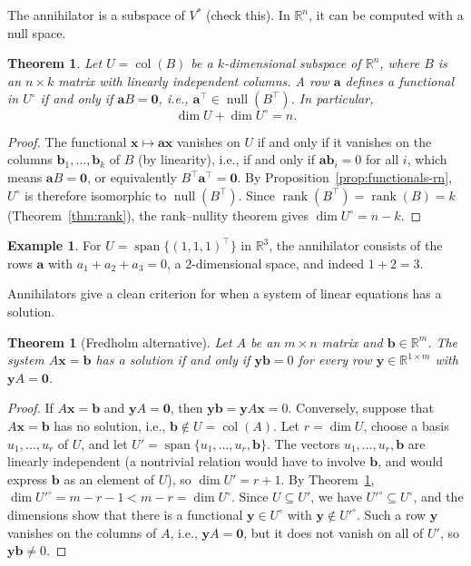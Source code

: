 \documentclass[11pt]{article}
\theoremstyle{definition}
\newtheorem{example}[definition]{Example}
\theoremstyle{plain}
\newtheorem{theorem}[definition]{Theorem}
\theoremstyle{remark}
\DeclareMathOperator{\rank}{rank}
\DeclareMathOperator{\Null}{null}
\DeclareMathOperator{\col}{col}
\DeclareMathOperator{\Span}{span}
\begin{document}
The annihilator is a subspace of $V^*$ (check this). In $\mathbb{R}^n$, it can be computed with a null space.

\begin{theorem}\label{thm:annihilator}
    Let $U = \col(B)$ be a $k$-dimensional subspace of $\mathbb{R}^n$, where $B$ is an $n \times k$ matrix with linearly independent columns. A row $\mathbf{a}$ defines a functional in $U^\circ$ if and only if $\mathbf{a}B = \mathbf{0}$, i.e., $\mathbf{a}^\top \in \Null(B^\top)$. In particular,
    \[\dim U + \dim U^\circ = n.\]
\end{theorem}

\begin{proof}
    The functional $\mathbf{x} \mapsto \mathbf{a}\mathbf{x}$ vanishes on $U$ if and only if it vanishes on the columns $\mathbf{b}_1, \ldots, \mathbf{b}_k$ of $B$ (by linearity), i.e., if and only if $\mathbf{a}\mathbf{b}_i = 0$ for all $i$, which means $\mathbf{a}B = \mathbf{0}$, or equivalently $B^\top \mathbf{a}^\top = \mathbf{0}$. By Proposition~\ref{prop:functionals-rn}, $U^\circ$ is therefore isomorphic to $\Null(B^\top)$. Since $\rank(B^\top) = \rank(B) = k$ (Theorem~\ref{thm:rank}), the rank--nullity theorem gives $\dim U^\circ = n - k$.
\end{proof}

\begin{example}
    For $U = \Span\{(1, 1, 1)^\top\}$ in $\mathbb{R}^3$, the annihilator consists of the rows $\mathbf{a}$ with $a_1 + a_2 + a_3 = 0$, a $2$-dimensional space, and indeed $1 + 2 = 3$.
\end{example}

Annihilators give a clean criterion for when a system of linear equations has a solution.

\begin{theorem}[Fredholm alternative]\label{thm:fredholm}
    Let $A$ be an $m \times n$ matrix and $\mathbf{b} \in \mathbb{R}^m$. The system $A\mathbf{x} = \mathbf{b}$ has a solution if and only if $\mathbf{y}\mathbf{b} = 0$ for every row $\mathbf{y} \in \mathbb{R}^{1 \times m}$ with $\mathbf{y}A = \mathbf{0}$.
\end{theorem}

\begin{proof}
    If $A\mathbf{x} = \mathbf{b}$ and $\mathbf{y}A = \mathbf{0}$, then $\mathbf{y}\mathbf{b} = \mathbf{y}A\mathbf{x} = 0$. Conversely, suppose that $A\mathbf{x} = \mathbf{b}$ has no solution, i.e., $\mathbf{b} \notin U = \col(A)$. Let $r = \dim U$, choose a basis $u_1, \ldots, u_r$ of $U$, and let $U' = \Span\{u_1, \ldots, u_r, \mathbf{b}\}$. The vectors $u_1, \ldots, u_r, \mathbf{b}$ are linearly independent (a nontrivial relation would have to involve $\mathbf{b}$, and would express $\mathbf{b}$ as an element of $U$), so $\dim U' = r + 1$. By Theorem~\ref{thm:annihilator}, $\dim {U'}^\circ = m - r - 1 < m - r = \dim U^\circ$. Since $U \subseteq U'$, we have ${U'}^\circ \subseteq U^\circ$, and the dimensions show that there is a functional $\mathbf{y} \in U^\circ$ with $\mathbf{y} \notin {U'}^\circ$. Such a row $\mathbf{y}$ vanishes on the columns of $A$, i.e., $\mathbf{y}A = \mathbf{0}$, but it does not vanish on all of $U'$, so $\mathbf{y}\mathbf{b} \neq 0$.
\end{proof}
\end{document}
